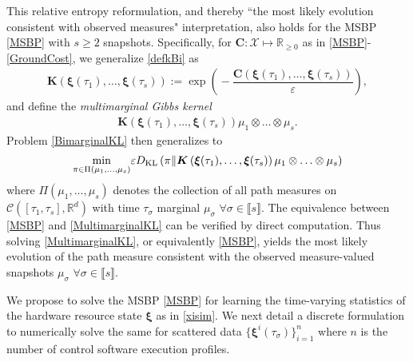 \documentclass[letterpaper, 10pt, twocolumn]{ieeeconf}      %
\begin{document}
This relative entropy reformulation, and thereby ``the most likely evolution consistent with observed measures" interpretation, also holds for the MSBP \eqref{MSBP} with $s\geq 2$ snapshots. Specifically, for $\bm{C}:\bm{\mathcal{X}}\mapsto\mathbb{R}_{\geq 0}$ as in \eqref{MSBP}-\eqref{GroundCost}, we generalize \eqref{defkBi} as
\begin{align}
\bm{K}\!\left(\!\bm{\xi}(\tau_1),\hdots,\bm{\xi}(\tau_s)\!\right) :=\exp\!\left(\!\!-\dfrac{\bm{C}\!\left(\bm{\xi}(\tau_1),\hdots,\bm{\xi}(\tau_s)\!\right)}{\varepsilon}\!\!\right),
\end{align}
and define the \emph{multimarginal Gibbs kernel}
\begin{align}
\bm{K}\left(\bm{\xi}(\tau_1),\hdots,\bm{\xi}(\tau_s)\right)\!\mu_1\otimes\hdots\otimes\mu_s.
\label{DefGibbsKernelMulti} 
\end{align}
Problem \eqref{BimarginalKL} then generalizes to
\begin{align}
\underset{\pi\in\Pi(\mu_1,\hdots,\mu_s)}{\min}\varepsilon D_{\rm{KL}}\left(\pi\Vert \bm{K}\left(\bm{\xi}(\tau_1),\hdots,\bm{\xi}(\tau_s)\right)\mu_1\otimes\hdots\otimes\mu_s\right)
\label{MultimarginalKL}
\end{align}
where $\Pi(\mu_1,\hdots,\mu_s)$ denotes the collection of all path measures on $\mathcal{C}\left([\tau_1,\tau_s],\mathbb{R}^{d}\right)$ with time $\tau_{\sigma}$ marginal $\mu_\sigma$ $\forall\sigma\in\llbracket s\rrbracket$. The equivalence between \eqref{MSBP} and \eqref{MultimarginalKL} can be verified by direct computation. Thus solving \eqref{MultimarginalKL}, or equivalently \eqref{MSBP}, yields the most likely evolution of the path measure consistent with the observed measure-valued snapshots $\mu_\sigma$ $\forall\sigma\in\llbracket s\rrbracket$.

We propose to solve the MSBP \eqref{MSBP} for learning the time-varying statistics of the hardware resource state $\bm{\xi}$ as in \eqref{xisim}. We next detail a discrete formulation to numerically solve the same for scattered data $\{\bm{\xi}^{i}(\tau_{\sigma})\}_{i=1}^{n}$ where $n$ is the number of control software execution profiles.
\end{document}

